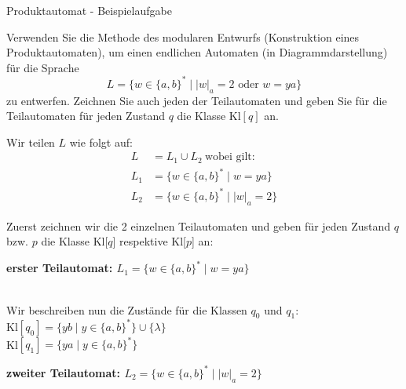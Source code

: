 \begin{subbox}{Produktautomat - Beispielaufgabe}

Verwenden Sie die Methode des modularen Entwurfs (Konstruktion eines Produktautomaten), um einen endlichen Automaten (in Diagrammdarstellung) für die Sprache 
$$L = \{w \in \{a, b\}^* \mid |w|_a = 2 \text{ oder } w = ya\}$$
zu entwerfen. Zeichnen Sie auch jeden der Teilautomaten und geben Sie für die Teilautomaten für jeden Zustand $q$ die Klasse Kl$[q]$ an.
\end{subbox}


Wir teilen $L$ wie folgt auf:
\begin{align*}
    L &= L_1 \cup L_2 \ \text{wobei gilt:} \\
    L_1 &= \{w \in \{a,b\}^* \mid w = ya\} \\
    L_2 &= \{w \in \{a,b\}^* \mid |w|_a = 2\}
\end{align*}

Zuerst zeichnen wir die 2 einzelnen Teilautomaten und geben für jeden Zustand $q$ bzw. $p$ die Klasse Kl[$q$] respektive Kl[$p$] an:

\textbf{erster Teilautomat: $L_1 = \{w \in \{a,b\}^* \mid  w = ya\}$}
\\Wir beschreiben nun die Zustände für die Klassen $q_0$ und $q_1$: \\
Kl$[q_0] = \{ yb \mid y \in \{a,b\}^* \} \cup \{\lambda\}$ \\
Kl$[q_1] = \{ya\mid  y \in \{a,b\}^*  \}$ 

\textbf{zweiter Teilautomat: $L_2 = \{w \in \{a,b\}^* \mid |w|_a = 2\}$}


